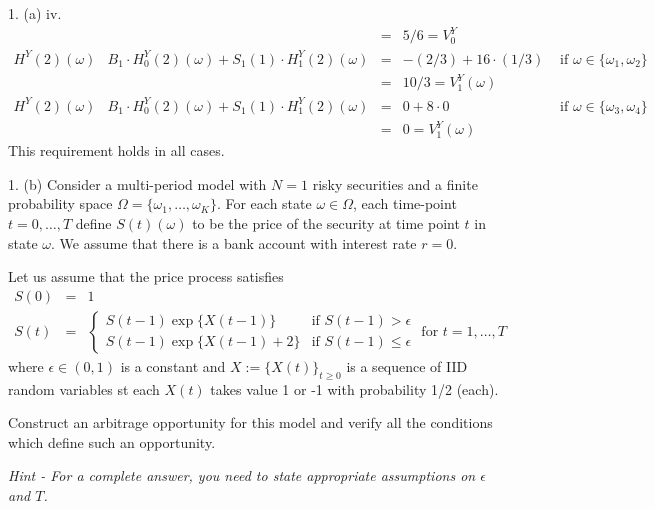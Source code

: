 \documentclass[11pt,a4paper]{article}
\begin{document}
\begin{answer}{1. (a) iv.}
\[\begin{array}{r|rclcll}
    &&=&5/6=V_0^Y\\
    H^Y(2)(\omega)&B_1\cdot H_0^Y(2)(\omega)+S_1(1)\cdot H_1^Y(2)(\omega)&=&-(2/3)+16\cdot(1/3)&\text{ if }\omega\in\{\omega_1,\omega_2\}\\
    &&=&10/3=V_1^Y(\omega)\\
    H^Y(2)(\omega)&B_1\cdot H_0^Y(2)(\omega)+S_1(1)\cdot H_1^Y(2)(\omega)&=&0+8\cdot0&\text{ if }\omega\in\{\omega_3,\omega_4\}\\
    &&=&0=V_1^Y(\omega)
  \end{array}\]
  This requirement holds in all cases.
\end{answer}

\begin{question}{1. (b)}
  Consider a multi-period model with $N=1$ risky securities and a finite probability space $\Omega=\{\omega_1,\dots,\omega_K\}$. For each state $\omega\in\Omega$, each time-point $t=0,\dots,T$ define $S(t)(\omega)$ to be the price of the security at time point $t$ in state $\omega$. We assume that there is a bank account with interest rate $r=0$.
  \par Let us assume that the price process satisfies
  \[\begin{array}{rcl}
    S(0)&=&1\\
    S(t)&=&\begin{cases}
      S(t-1)\exp\{X(t-1)\}&\text{if }S(t-1)>\epsilon\\
      S(t-1)\exp\{X(t-1)+2\}&\text{if }S(t-1)\leq\epsilon
  \end{cases}\text{ for }t=1,\dots,T
  \end{array}\]
  where $\epsilon\in(0,1)$ is a constant and $X:=\{X(t)\}_{t\geq0}$ is a sequence of IID random variables st each $X(t)$ takes value 1 or -1 with probability 1/2 (each).
  \par Construct an arbitrage opportunity for this model and verify all the conditions which define such an opportunity.
  \par \textit{Hint - For a complete answer, you need to state appropriate assumptions on $\epsilon$ and $T$.}
\end{question}
\end{document}
